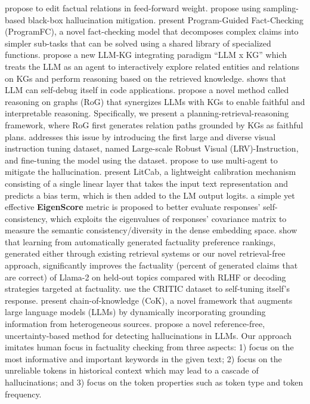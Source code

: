 \cite{meng2023locating} propose to edit factual relations in feed-forward weight.
\cite{manakul2023self} propose using sampling-based black-box hallucination mitigation.
\cite{pan2023fact} present Program-Guided Fact-Checking (ProgramFC), a novel fact-checking model that decomposes complex claims into simpler sub-tasks that can be solved using a shared library of specialized functions.
\cite{feng2024unveiling}
\cite{sun2024thinkongraph} propose a new LLM-KG integrating paradigm ``LLM x KG'' which treats the LLM as an agent to interactively explore related entities and relations on KGs and perform reasoning based on the retrieved knowledge.
\cite{chen2024teaching} shows that LLM can self-debug itself in code applications.
\cite{luo2024reasoning} propose a novel method called reasoning on graphs (RoG) that synergizes LLMs with KGs to enable faithful and interpretable reasoning. Specifically, we present a planning-retrieval-reasoning framework, where RoG first generates relation paths grounded by KGs as faithful plans.
\cite{liu2024mitigating} addresses this issue by introducing the first large and diverse visual instruction tuning dataset, named Large-scale Robust Visual (LRV)-Instruction, and fine-tuning the model using the dataset.
\cite{hong2024metagpt} propose to use multi-agent to mitigate the hallucination.
\cite{liu2024litcab} present LitCab, a lightweight calibration mechanism consisting of a single linear layer that takes the input text representation and predicts a bias term, which is then added to the LM output logits.
\cite{chen2024inside} a simple yet effective \textbf{EigenScore} metric is proposed to better evaluate responses' self-consistency, which exploits the eigenvalues of responses' covariance matrix to measure the semantic consistency/diversity in the dense embedding space.
\cite{tian2024finetuning} show that learning from automatically generated factuality preference rankings, generated either through existing retrieval systems or our novel retrieval-free approach, significantly improves the factuality (percent of generated claims that are correct) of Llama-2 on held-out topics compared with RLHF or decoding strategies targeted at factuality.
\cite{gou2024critic} use the CRITIC dataset to self-tuning itself's response.
\cite{li2024chainofknowledge} present chain-of-knowledge (CoK), a novel framework that augments large language models (LLMs) by dynamically incorporating grounding information from heterogeneous sources.
\cite{zhang2023enhancing} propose a novel reference-free, uncertainty-based method for detecting hallucinations in LLMs. Our approach imitates human focus in factuality checking from three aspects: 1) focus on the most informative and important keywords in the given text; 2) focus on the unreliable tokens in historical context which may lead to a cascade of hallucinations; and 3) focus on the token properties such as token type and token frequency.
